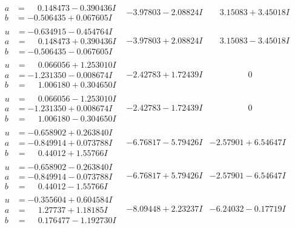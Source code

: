 \documentclass[1p]{elsarticle_modified}
\theoremstyle{definition}
\begin{document}
$$\begin{array}{c|c|c}
\begin{aligned}
a &= \phantom{-}0.148473 - 0.390436 I \\
b &= -0.506435 + 0.067605 I\end{aligned}
 & -3.97803 - 2.08824 I & \phantom{-}3.15083 + 3.45018 I \\ \hline\begin{aligned}
u &= -0.634915 - 0.454764 I \\
a &= \phantom{-}0.148473 + 0.390436 I \\
b &= -0.506435 - 0.067605 I\end{aligned}
 & -3.97803 + 2.08824 I & \phantom{-}3.15083 - 3.45018 I \\ \hline\begin{aligned}
u &= \phantom{-}0.066056 + 1.253010 I \\
a &= -1.231350 - 0.008674 I \\
b &= \phantom{-}1.006180 + 0.304650 I\end{aligned}
 & -2.42783 + 1.72439 I & \phantom{-0.000000 } 0 \\ \hline\begin{aligned}
u &= \phantom{-}0.066056 - 1.253010 I \\
a &= -1.231350 + 0.008674 I \\
b &= \phantom{-}1.006180 - 0.304650 I\end{aligned}
 & -2.42783 - 1.72439 I & \phantom{-0.000000 } 0 \\ \hline\begin{aligned}
u &= -0.658902 + 0.263840 I \\
a &= -0.849914 + 0.073788 I \\
b &= \phantom{-}0.44012 + 1.55766 I\end{aligned}
 & -6.76817 - 5.79426 I & -2.57901 + 6.54647 I \\ \hline\begin{aligned}
u &= -0.658902 - 0.263840 I \\
a &= -0.849914 - 0.073788 I \\
b &= \phantom{-}0.44012 - 1.55766 I\end{aligned}
 & -6.76817 + 5.79426 I & -2.57901 - 6.54647 I \\ \hline\begin{aligned}
u &= -0.355604 + 0.604584 I \\
a &= \phantom{-}1.27737 + 1.18185 I \\
b &= \phantom{-}0.176477 - 1.192730 I\end{aligned}
 & -8.09448 + 2.23237 I & -6.24032 - 0.17719 I \\ \hline\begin{aligned}

\end{aligned}
\end{array}$$
\end{document}
